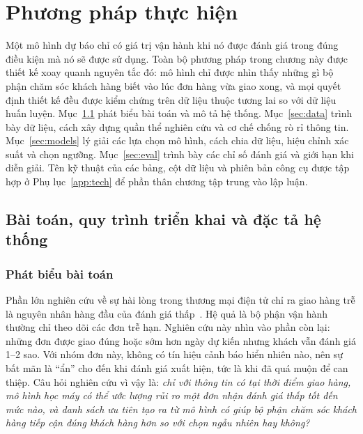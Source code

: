 \documentclass[12pt,a4paper]{report}
\begin{document}
\chapter{Phương pháp thực hiện}\label{ch:method}

Một mô hình dự báo chỉ có giá trị vận hành khi nó được đánh giá trong đúng điều kiện mà nó sẽ được sử dụng. Toàn bộ phương pháp trong chương này được thiết kế xoay quanh nguyên tắc đó: mô hình chỉ được nhìn thấy những gì bộ phận chăm sóc khách hàng biết vào lúc đơn hàng vừa giao xong, và mọi quyết định thiết kế đều được kiểm chứng trên dữ liệu thuộc tương lai so với dữ liệu huấn luyện. Mục~\ref{sec:pipeline} phát biểu bài toán và mô tả hệ thống. Mục~\ref{sec:data} trình bày dữ liệu, cách xây dựng quần thể nghiên cứu và cơ chế chống rò rỉ thông tin. Mục~\ref{sec:models} lý giải các lựa chọn mô hình, cách chia dữ liệu, hiệu chỉnh xác suất và chọn ngưỡng. Mục~\ref{sec:eval} trình bày các chỉ số đánh giá và giới hạn khi diễn giải. Tên kỹ thuật của các bảng, cột dữ liệu và phiên bản công cụ được tập hợp ở Phụ lục~\ref{app:tech} để phần thân chương tập trung vào lập luận.

\section{Bài toán, quy trình triển khai và đặc tả hệ thống}\label{sec:pipeline}

\subsection{Phát biểu bài toán}

Phần lớn nghiên cứu về sự hài lòng trong thương mại điện tử chỉ ra giao hàng trễ là nguyên nhân hàng đầu của đánh giá thấp~\cite{ravula2023,deshpande2023}. Hệ quả là bộ phận vận hành thường chỉ theo dõi các đơn trễ hạn. Nghiên cứu này nhìn vào phần còn lại: những đơn được giao đúng hoặc sớm hơn ngày dự kiến nhưng khách vẫn đánh giá 1--2 sao. Với nhóm đơn này, không có tín hiệu cảnh báo hiển nhiên nào, nên sự bất mãn là ``ẩn'' cho đến khi đánh giá xuất hiện, tức là khi đã quá muộn để can thiệp. Câu hỏi nghiên cứu vì vậy là: \emph{chỉ với thông tin có tại thời điểm giao hàng, mô hình học máy có thể ước lượng rủi ro một đơn nhận đánh giá thấp tốt đến mức nào, và danh sách ưu tiên tạo ra từ mô hình có giúp bộ phận chăm sóc khách hàng tiếp cận đúng khách hàng hơn so với chọn ngẫu nhiên hay không?}
\end{document}

